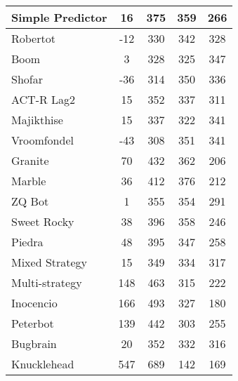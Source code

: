 \begin{table*}
\begin{tabular}{|l|c|c|c|c|}
Simple Predictor & 16 & 375 & 359 & 266 \\ \hline 
Robertot & -12 & 330 & 342 & 328 \\ \hline 
Boom & 3 & 328 & 325 & 347 \\ \hline 
Shofar & -36 & 314 & 350 & 336 \\ \hline 
ACT-R Lag2 & 15 & 352 & 337 & 311 \\ \hline 
Majikthise & 15 & 337 & 322 & 341 \\ \hline 
Vroomfondel & -43 & 308 & 351 & 341 \\ \hline 
Granite & 70 & 432 & 362 & 206 \\ \hline 
Marble & 36 & 412 & 376 & 212 \\ \hline 
ZQ Bot & 1 & 355 & 354 & 291 \\ \hline 
Sweet Rocky & 38 & 396 & 358 & 246 \\ \hline 
Piedra & 48 & 395 & 347 & 258 \\ \hline 
Mixed Strategy & 15 & 349 & 334 & 317 \\ \hline 
Multi-strategy & 148 & 463 & 315 & 222 \\ \hline 
Inocencio & 166 & 493 & 327 & 180 \\ \hline 
Peterbot & 139 & 442 & 303 & 255 \\ \hline 
Bugbrain & 20 & 352 & 332 & 316 \\ \hline 
Knucklehead & 547 & 689 & 142 & 169 \\ \hline
        \end{tabular}
    \end{table*}